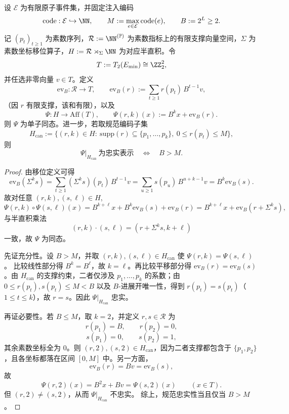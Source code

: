 \begin{theorem}\label{thm:killo-godel-semidir-affine-2adic}
设 \(\mathcal E\) 为有限原子事件集，并固定注入编码
\[
\mathrm{code}:\mathcal E\hookrightarrow\NN,\qquad
M:=\max_{e\in\mathcal E}\mathrm{code}(e),\qquad B:=2^L\ge 2.
\]
记 \((p_t)_{t\ge 1}\) 为素数序列，\(\mathcal R:=\NN^{(\mathbb P)}\) 为素数指标上的有限支撑向量空间，\(\Sigma\) 为素数坐标移位算子，\(H:=\mathcal R\rtimes_{\Sigma}\NN\) 为对应半直积。令
\[
T:=T_2(E_{\min})\cong\ZZ_2^2,
\]
并任选非零向量 \(v\in T\)。定义
\[
\mathrm{ev}_B:\mathcal R\to T,\qquad
\mathrm{ev}_B(r):=\sum_{t\ge 1} r(p_t)\,B^{t-1}v,
\]
（因 \(r\) 有限支撑，该和有限），以及
\[
\Psi:H\to\mathrm{Aff}(T),\qquad
\Psi(r,k)(x):=B^k x+\mathrm{ev}_B(r).
\]
则 \(\Psi\) 为单子同态。进一步，若取规范编码子集
\[
H_{\mathrm{can}}
:=\{(r,k)\in H:\ \mathrm{supp}(r)\subseteq\{p_1,\dots,p_k\},\ 0\le r(p_t)\le M\},
\]
则
\[
\Psi|_{H_{\mathrm{can}}}\ \text{为忠实表示}
\quad\Longleftrightarrow\quad
B>M.
\]
\end{theorem}
\begin{proof}
由移位定义可得
\[
\mathrm{ev}_B(\Sigma^k s)
=\sum_{t\ge 1}(\Sigma^k s)(p_t)\,B^{t-1}v
=\sum_{u\ge 1}s(p_u)\,B^{u+k-1}v
=B^k\mathrm{ev}_B(s).
\]
故对任意 \((r,k),(s,\ell)\in H\),
\[
\Psi(r,k)\!\circ\!\Psi(s,\ell)(x)
=B^{k+\ell}x+B^k\mathrm{ev}_B(s)+\mathrm{ev}_B(r)
=B^{k+\ell}x+\mathrm{ev}_B(r+\Sigma^k s),
\]
与半直积乘法
\[
(r,k)\cdot(s,\ell)=(r+\Sigma^k s,k+\ell)
\]
一致，故 \(\Psi\) 为同态。

先证充分性。设 \(B>M\)，并取 \((r,k),(s,\ell)\in H_{\mathrm{can}}\) 使
\(
\Psi(r,k)=\Psi(s,\ell)
\)。
比较线性部分得 \(B^k=B^\ell\)，故 \(k=\ell\)。再比较平移部分得 \(\mathrm{ev}_B(r)=\mathrm{ev}_B(s)\)。由 \(H_{\mathrm{can}}\) 的支撑约束，二者仅涉及 \(p_1,\dots,p_k\) 的系数；由 \(0\le r(p_t),s(p_t)\le M<B\) 以及 \(B\)-进展开唯一性，得到 \(r(p_t)=s(p_t)\)（\(1\le t\le k\)），故 \(r=s\)。因此 \(\Psi|_{H_{\mathrm{can}}}\) 忠实。

再证必要性。若 \(B\le M\)，取 \(k=2\)，并定义 \(r,s\in\mathcal R\) 为
\[
r(p_1)=B,\qquad r(p_2)=0,
\]
\[
s(p_1)=0,\qquad s(p_2)=1,
\]
其余素数坐标全为 \(0\)。则 \((r,2),(s,2)\in H_{\mathrm{can}}\)，因为二者支撑都包含于 \(\{p_1,p_2\}\)，且各坐标都落在区间 \([0,M]\) 中。另一方面，
\[
\mathrm{ev}_B(r)=Bv=\mathrm{ev}_B(s),
\]
故
\[
\Psi(r,2)(x)=B^2x+Bv=\Psi(s,2)(x)
\qquad (x\in T).
\]
但 \((r,2)\neq (s,2)\)，从而 \(\Psi|_{H_{\mathrm{can}}}\) 不忠实。
综上，规范忠实性当且仅当 \(B>M\)。
\end{proof}

